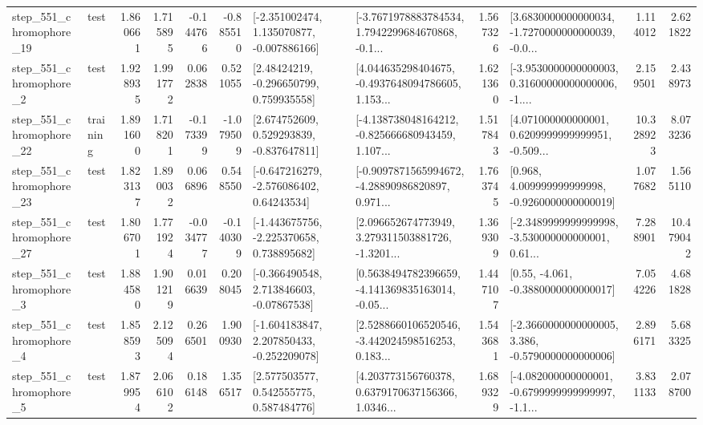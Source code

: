 \begin{tabular}{llrrrrllrlrr}
  step\_551\_chromophore\_19 &      test &      1.860661 &    1.715895 &     -0.144766 & -0.885510 &   [-2.351002474, 1.135070877, -0.007886166] &  [-3.7671978883784534, 1.7942299684670868, -0.1... &       1.567326 &  [3.6830000000000034, -1.7270000000000039, -0.0... &            1.114012 &          2.621822 \\
   step\_551\_chromophore\_2 &      test &      1.928935 &    1.991772 &      0.062838 &  0.521055 &     [2.48424219, -0.296650799, 0.759935558] &  [4.044635298404675, -0.4937648094786605, 1.153... &       1.621360 &  [-3.9530000000000003, 0.31600000000000006, -1.... &            2.159501 &          2.438973 \\
  step\_551\_chromophore\_22 &  training &      1.891600 &    1.718201 &     -0.173399 & -1.079509 &    [2.674752609, 0.529293839, -0.837647811] &  [-4.138738048164212, -0.825666680943459, 1.107... &       1.517843 &  [4.071000000000001, 0.6209999999999951, -0.509... &           10.328923 &          8.073236 \\
  step\_551\_chromophore\_23 &      test &      1.823137 &    1.890032 &      0.066896 &  0.548550 &    [-0.647216279, -2.576086402, 0.64243534] &  [-0.9097871565994672, -4.28890986820897, 0.971... &       1.763745 &    [0.968, 4.009999999999998, -0.9260000000000019] &            1.077682 &          1.565110 \\
  step\_551\_chromophore\_27 &      test &      1.806701 &    1.771924 &     -0.034777 & -0.140309 &   [-1.443675756, -2.225370658, 0.738895682] &  [2.096652674773949, 3.279311503881726, -1.3201... &       1.369309 &  [-2.3489999999999998, -3.530000000000001, 0.61... &            7.288901 &         10.479042 \\
   step\_551\_chromophore\_3 &      test &      1.884580 &    1.901219 &      0.016639 &  0.208045 &    [-0.366490548, 2.713846603, -0.07867538] &  [0.5638494782396659, -4.141369835163014, -0.05... &       1.447107 &                [0.55, -4.061, -0.3880000000000017] &            7.054226 &          4.681828 \\
   step\_551\_chromophore\_4 &      test &      1.858593 &    2.125094 &      0.266501 &  1.900930 &   [-1.604183847, 2.207850433, -0.252209078] &  [2.5288660106520546, -3.442024598516253, 0.183... &       1.543681 &  [-2.3660000000000005, 3.386, -0.5790000000000006] &            2.896171 &          5.683325 \\
   step\_551\_chromophore\_5 &      test &      1.879954 &    2.066102 &      0.186148 &  1.356517 &     [2.577503577, 0.542555775, 0.587484776] &  [4.203773156760378, 0.6379170637156366, 1.0346... &       1.689329 &  [-4.082000000000001, -0.6799999999999997, -1.1... &            3.831133 &          2.078700 \\

\end{tabular}
